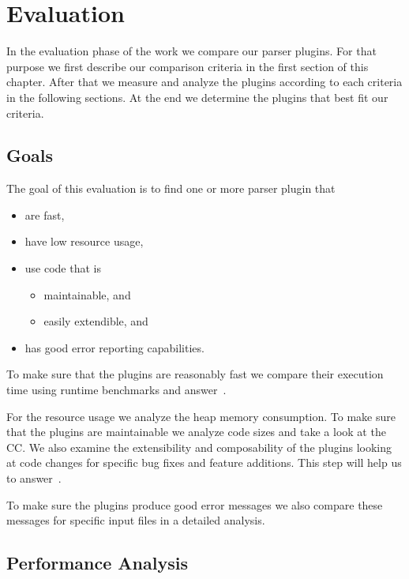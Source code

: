 \chapter{Evaluation}
\label{sec:evaluation}

In the evaluation phase of the work we compare our parser plugins. For that purpose we first describe our comparison criteria in the first section of this chapter. After that we measure and analyze the plugins according to each criteria in the following sections. At the end we determine the plugins that best fit our criteria.

\section{Goals}

The goal of this evaluation is to find one or more parser plugin that
\begin{itemize}
  \item are fast,
  \item have low resource usage,
  \item use code that is
    \begin{itemize}
      \item maintainable, and
      \item easily extendible, and
    \end{itemize}
  \item has good error reporting capabilities.
\end{itemize}

To make sure that the plugins are reasonably fast we compare their execution time using runtime benchmarks and answer~.

  \speed*

For the resource usage we analyze the heap memory consumption. To make sure that the plugins are maintainable we analyze code sizes and take a look at the \glsdesc{CC}. We also examine the extensibility and composability of the plugins looking at code changes for specific bug fixes and feature additions. This step will help us to answer~.

  \closeness*

To make sure the plugins produce good error messages we also compare these messages for specific input files in a detailed analysis.

\section{Performance Analysis}

